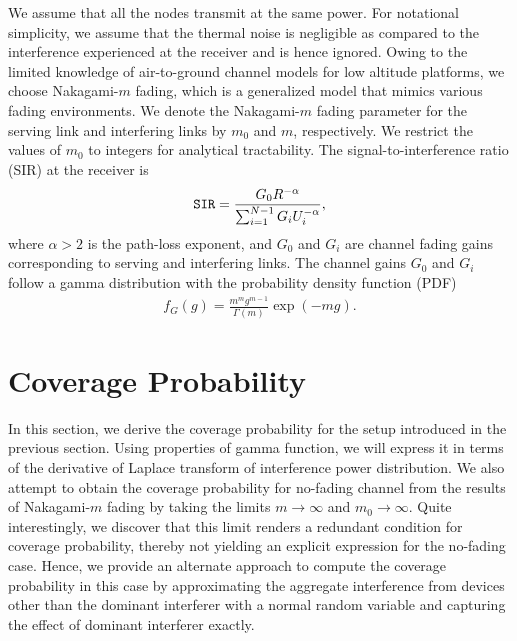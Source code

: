 \documentclass[journal,draftclsnofoot,onecolumn,12pt]{IEEEtran}
\begin{document}
We assume that all the nodes transmit at the same power. For notational simplicity, we assume that the thermal noise is negligible as compared to the interference experienced at the receiver and is hence ignored. Owing to the limited knowledge of air-to-ground channel models for low altitude platforms, we choose Nakagami-$m$ fading, which is a generalized model that mimics various fading environments. We denote the Nakagami-$m$ fading parameter for the serving link and interfering links by $m_0$ and $m$, respectively. We restrict the values of $m_0$ to integers for analytical tractability. The signal-to-interference ratio (SIR) at the receiver is 
\begin{equation*}
\mathtt{SIR} = \frac{G_0 R^{-\alpha}}{\sum_{i=1}^{N-1} G_i U_i^{-\alpha}},
\end{equation*}
where $\alpha > 2$ is the path-loss exponent, and $G_0$ and $G_i$ are channel fading gains corresponding to serving and interfering links. The channel gains $G_0$ and $G_i$ follow a gamma distribution with the probability density function (PDF)~\cite{wackerly}
\begin{align*}
f_G(g) = \frac{m^m g^{m-1}}{\Gamma(m)}\exp({-mg}).
\end{align*}
 

\section{Coverage Probability}\label{sec:pc}
In this section, we derive the coverage probability for the setup introduced in the previous section. Using properties of gamma function, we will express it in terms of the derivative of Laplace transform of interference power distribution. We also attempt to obtain the coverage probability for no-fading channel from the results of Nakagami-$m$ fading by taking the limits $m \to \infty$ and $m_0 \to \infty$. Quite interestingly, we discover that this limit renders a redundant condition for coverage probability, thereby not yielding an explicit expression for the no-fading case. Hence, we provide an alternate approach to compute the coverage probability in this case by approximating the aggregate interference from devices other than the dominant interferer with a normal random variable and capturing the effect of dominant interferer exactly. 
\end{document}
